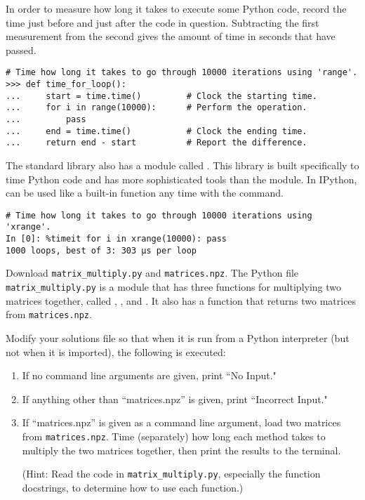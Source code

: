 In order to measure how long it takes to execute some Python code, record the time just before and just after the code in question.
Subtracting the first measurement from the second gives the amount of time in seconds that have passed.

\begin{lstlisting}
# Time how long it takes to go through 10000 iterations using 'range'.
>>> def time_for_loop():
...     start = time.time()         # Clock the starting time.
...     for i in range(10000):      # Perform the operation.
...         pass
...     end = time.time()           # Clock the ending time.
...     return end - start          # Report the difference.
\end{lstlisting}

The standard library also has a module called .
This library is built specifically to time Python code and has more sophisticated tools than the  module.
In IPython,  can be used like a built-in function any time with the  command.

\begin{lstlisting}
# Time how long it takes to go through 10000 iterations using 'xrange'.
In [0]: %timeit for i in xrange(10000): pass 
1000 loops, best of 3: 303 µs per loop
\end{lstlisting}

\begin{problem}
Download \texttt{matrix\_multiply.py} and \texttt{matrices.npz}.
The Python file \texttt{matrix\_multiply.py} is a module that has three functions for multiplying two matrices together, called , , and .
It also has a  function that returns two matrices from \texttt{matrices.npz}.

Modify your solutions file so that when it is run from a Python interpreter (but not when it is imported), the following is executed:
\begin{enumerate}
\item If no command line arguments are given, print ``No Input."
\item If anything other than ``matrices.npz'' is given, print ``Incorrect Input."
\item If ``matrices.npz'' is given as a command line argument, load two matrices from \texttt{matrices.npz}. Time (separately) how long each method takes to multiply the two matrices together, then print the results to the terminal.

(Hint: Read the code in \texttt{matrix\_multiply.py}, especially the function docstrings, to determine how to use each function.)
\end{enumerate}
\end{problem}
